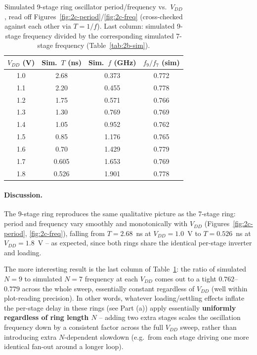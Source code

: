 \begin{table}[h]
  \centering
  \begin{tabular}{|c|c|c|c|}
    \hline
    $V_{DD}$ (V) & Sim.\ $T$ (ns) & Sim.\ $f$ (GHz) & $f_9/f_7$ (sim) \\
    \hline
    1.0 & 2.68  & 0.373 & 0.772 \\
    1.1 & 2.20  & 0.455 & 0.778 \\
    1.2 & 1.75  & 0.571 & 0.766 \\
    1.3 & 1.30  & 0.769 & 0.769 \\
    1.4 & 1.05  & 0.952 & 0.762 \\
    1.5 & 0.85  & 1.176 & 0.765 \\
    1.6 & 0.70  & 1.429 & 0.779 \\
    1.7 & 0.605 & 1.653 & 0.769 \\
    1.8 & 0.526 & 1.901 & 0.778 \\
    \hline
  \end{tabular}
  \caption{Simulated 9-stage ring oscillator period/frequency vs.\ $V_{DD}$,
  read off Figures~\ref{fig:2c-period}/\ref{fig:2c-freq} (cross-checked
  against each other via $T=1/f$). Last column: simulated 9-stage frequency
  divided by the corresponding simulated 7-stage frequency
  (Table~\ref{tab:2b-sim}).}
  \label{tab:2c-sim}
\end{table}

\paragraph{Discussion.} The 9-stage ring reproduces the same qualitative
picture as the 7-stage ring: period and frequency vary smoothly and
monotonically with $V_{DD}$ (Figures~\ref{fig:2c-period},
\ref{fig:2c-freq}), falling from $T=2.68$~ns at $V_{DD}=1.0$~V to
$T=0.526$~ns at $V_{DD}=1.8$~V -- as expected, since both rings share the
identical per-stage inverter and loading.

The more interesting result is the last column of Table~\ref{tab:2c-sim}: the
ratio of simulated $N=9$ to simulated $N=7$ frequency at each $V_{DD}$ comes
out to a tight $0.762$--$0.779$ across the whole sweep, essentially constant
regardless of $V_{DD}$ (well within plot-reading precision). In other words,
whatever loading/settling effects inflate the per-stage delay in these rings
(see Part (a)) apply essentially \textbf{uniformly regardless of ring length
$N$} -- adding two extra stages scales the oscillation frequency down by a
consistent factor across the full $V_{DD}$ sweep, rather than introducing
extra $N$-dependent slowdown (e.g.\ from each stage driving one more
identical fan-out around a longer loop).
